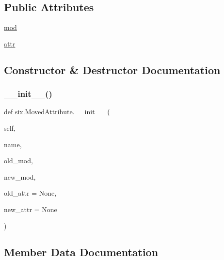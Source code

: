 \subsection*{Public Attributes}
\begin{DoxyCompactItemize}
\item 
\hyperlink{classsix_1_1MovedAttribute_af2ed71d99c69389444c7b887df9f6e33}{mod}
\item 
\hyperlink{classsix_1_1MovedAttribute_acd7d59165cf01ac7810cf2a83d7a3628}{attr}
\end{DoxyCompactItemize}


\subsection{Constructor \& Destructor Documentation}
\mbox{\label{classsix_1_1MovedAttribute_a1240d0b7627c71d6fff8b21ef22013fa}} 
\subsubsection{\texorpdfstring{\+\_\+\+\_\+init\+\_\+\+\_\+()}{\_\_init\_\_()}}
{\footnotesize\ttfamily def six.\+Moved\+Attribute.\+\_\+\+\_\+init\+\_\+\+\_\+ (\begin{DoxyParamCaption}\item[{}]{self,  }\item[{}]{name,  }\item[{}]{old\+\_\+mod,  }\item[{}]{new\+\_\+mod,  }\item[{}]{old\+\_\+attr = {\ttfamily None},  }\item[{}]{new\+\_\+attr = {\ttfamily None} }\end{DoxyParamCaption})}



\subsection{Member Data Documentation}
\mbox{\label{classsix_1_1MovedAttribute_acd7d59165cf01ac7810cf2a83d7a3628}} 

